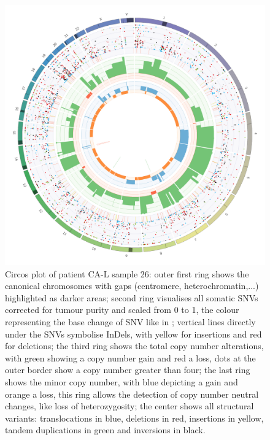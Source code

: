 \begin{figure}[ht]
\centering
\includegraphics[width=.99\linewidth]{Figures/CASCADE/CA86/CA86-26.circos.png}
\caption[Circos plot of patient CA-L sample 26]{Circos plot of patient CA-L sample 26: outer first ring shows the canonical chromosomes with gaps (centromere, heterochromatin,...) highlighted as darker areas; second ring visualises all somatic SNVs corrected for tumour purity and scaled from 0 to 1, the colour representing the base change of SNV like in \protect\textcite{Alexandrov2013}; vertical lines directly under the SNVs symbolise InDels, with yellow for insertions and red for deletions; the third ring shows the total copy number alterations, with green showing a copy number gain and red a loss, dots at the outer border show a copy number greater than four; the last ring shows the minor copy number, with blue depicting a gain and orange a loss, this ring allows the detection of copy number neutral changes, like loss of heterozygosity; the center shows all structural variants: translocations in blue, deletions in red, insertions in yellow, tandem duplications in green and inversions in black.} \label{fig:ca86.26circos}
\end{figure}


